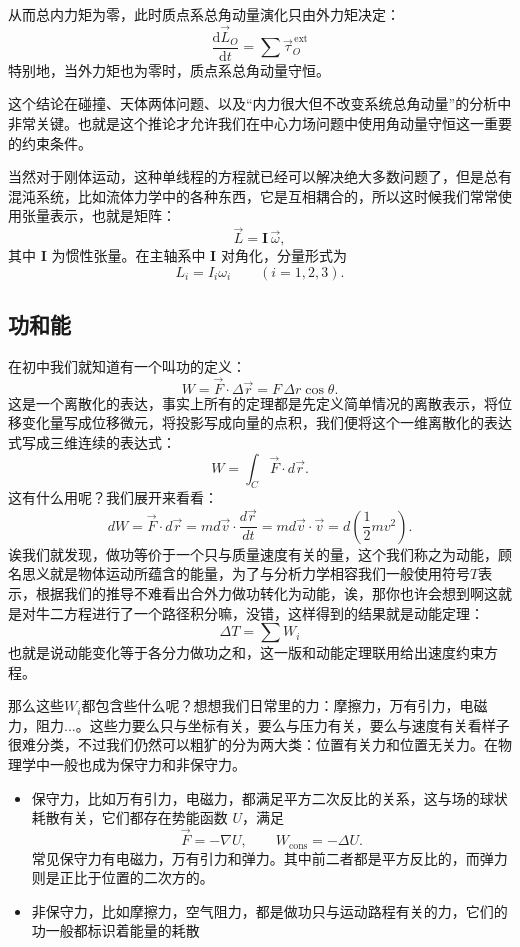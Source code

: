\documentclass[UTF8]{ctexbook}
\begin{document}
从而总内力矩为零，此时质点系总角动量演化只由外力矩决定：
\[
\frac{\mathrm d\vec{L}_O}{\mathrm dt}=\sum \vec{\tau}_O^{\,\text{ext}}
\]
特别地，当外力矩也为零时，质点系总角动量守恒。

这个结论在碰撞、天体两体问题、以及“内力很大但不改变系统总角动量”的分析中非常关键。也就是这个推论才允许我们在中心力场问题中使用角动量守恒这一重要的约束条件。


当然对于刚体运动，这种单线程的方程就已经可以解决绝大多数问题了，但是总有混沌系统，比如流体力学中的各种东西，它是互相耦合的，所以这时候我们常常使用张量表示，也就是矩阵：
\[
\vec{L}=\mathbf I\,\vec{\omega},
\]
其中 \(\mathbf I\) 为惯性张量。在主轴系中 \(\mathbf I\) 对角化，分量形式为
\[
L_i=I_i\omega_i\qquad (i=1,2,3).
\]

\subsection{功和能}

在初中我们就知道有一个叫功的定义：
\[
W=\vec{F}\cdot\Delta\vec{r}=F\,\Delta r\cos\theta.
\]
这是一个离散化的表达，事实上所有的定理都是先定义简单情况的离散表示，将位移变化量写成位移微元，将投影写成向量的点积，我们便将这个一维离散化的表达式写成三维连续的表达式：
\[
W=\int_{C}\vec{F}\cdot d\vec{r}.
\]
这有什么用呢？我们展开来看看：
\[
dW=\vec{F}\cdot d\vec{r}=md\vec{v} \cdot \frac{d\vec{r}}{dt}=md\vec{v} \cdot \vec{v}=d(\frac12 mv^2) .
\]
诶我们就发现，做功等价于一个只与质量速度有关的量，这个我们称之为动能，顾名思义就是物体运动所蕴含的能量，为了与分析力学相容我们一般使用符号$T$表示，根据我们的推导不难看出合外力做功转化为动能，诶，那你也许会想到啊这就是对牛二方程进行了一个路径积分嘛，没错，这样得到的结果就是动能定理：
\[
\Delta T = \sum W_i
\]
也就是说动能变化等于各分力做功之和，这一版和动能定理联用给出速度约束方程。

那么这些$W_i$都包含些什么呢？想想我们日常里的力：摩擦力，万有引力，电磁力，阻力...。这些力要么只与坐标有关，要么与压力有关，要么与速度有关看样子很难分类，不过我们仍然可以粗犷的分为两大类：位置有关力和位置无关力。在物理学中一般也成为保守力和非保守力。


\begin{itemize}
\item 保守力，比如万有引力，电磁力，都满足平方二次反比的关系，这与场的球状耗散有关，它们都存在势能函数 $U$，满足
\[
\vec{F}=-\nabla U,
\qquad
W_{\text{cons}}=-\Delta U.
\]
常见保守力有电磁力，万有引力和弹力。其中前二者都是平方反比的，而弹力则是正比于位置的二次方的。

\item 非保守力，比如摩擦力，空气阻力，都是做功只与运动路程有关的力，它们的功一般都标识着能量的耗散
\end{itemize}
\end{document}
